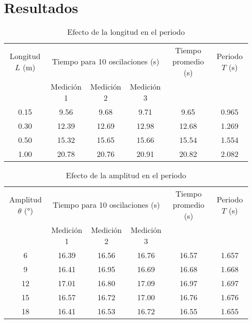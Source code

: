 \documentclass[letterpaper]{report}
\numberwithin{table}{section}
\begin{document}
\section{Resultados}
\begin{table}[ht]
  \centering
  \begin{tabular}{cccccc}
    \toprule
    Longitud $L$ (m) & \multicolumn{3}{c}{Tiempo para 10
    oscilaciones (s)} & Tiempo promedio (s) & Periodo $T$ (s) \\
    \cmidrule(lr){2-4}
    & Medición 1 & Medición 2 & Medición 3 &  &  \\
    \midrule
    0.15 &  9.56 &  9.68 &  9.71 &  9.65 & 0.965 \\
    0.30 & 12.39 & 12.69 & 12.98 & 12.68 & 1.269 \\
    0.50 & 15.32 & 15.65 & 15.66 & 15.54 & 1.554 \\
    1.00 & 20.78 & 20.76 & 20.91 & 20.82 & 2.082 \\
    \bottomrule
  \end{tabular}
  \caption{Efecto de la longitud en el periodo}\label{tab:longitud_periodo}
\end{table}

\begin{table}[ht]
  \centering
  \begin{tabular}{cccccc}
    \toprule
    Amplitud $\theta$ (°) & \multicolumn{3}{c}{Tiempo para 10
    oscilaciones (s)} & Tiempo promedio (s) & Periodo $T$ (s) \\
    \cmidrule(lr){2-4}
    & Medición 1 & Medición 2 & Medición 3 &  &  \\
    \midrule
    6   & 16.39 & 16.56 & 16.76 & 16.57 & 1.657 \\
    9   & 16.41 & 16.95 & 16.69 & 16.68 & 1.668 \\
    12  & 17.01 & 16.80 & 17.09 & 16.97 & 1.697 \\
    15  & 16.57 & 16.72 & 17.00 & 16.76 & 1.676 \\
    18  & 16.41 & 16.53 & 16.72 & 16.55 & 1.655 \\
    \bottomrule
  \end{tabular}
  \caption{Efecto de la amplitud en el periodo}\label{tab:amplitud_periodo}
\end{table}
\end{document}
